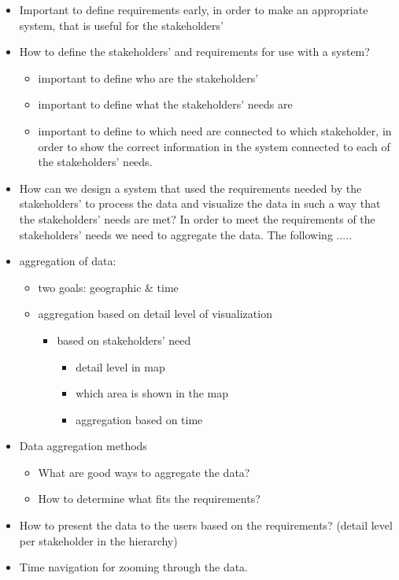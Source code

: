 \begin{itemize}
	\item Important to define requirements early, in order to make an appropriate system, that is useful for the stakeholders'
	\item How to define the stakeholders' and requirements for use with a system?
	\begin{itemize}
		\item important to define who are the stakeholders'
		\item important to define what the stakeholders' needs are
		\item important to define to which need are connected to which stakeholder, in order to show the correct information in the system connected to each of the stakeholders' needs.
	\end{itemize}
	\item How can we design a system that used the requirements needed by the stakeholders' to process the data and visualize the data in such a way that the stakeholders' needs are met?
	In order to meet the requirements of the stakeholders' needs we need to aggregate the data. The following .....
	\item aggregation of data:
	\begin{itemize}
		\item two goals: geographic \& time
		\item aggregation based on detail level of visualization
		\begin{itemize}
			\item based on stakeholders' need
			\begin{itemize}
				\item detail level in map
				\item which area is shown in the map
				\item aggregation based on time
			\end{itemize}
		\end{itemize}
	\end{itemize}
	\item Data aggregation methods
	\begin{itemize}
		\item What are good ways to aggregate the data?
		\item How to determine what fits the requirements?
	\end{itemize}
	\item How to present the data to the users based on the requirements? (detail
	level per stakeholder in the hierarchy)
	\item Time navigation for zooming through the data.
\end{itemize}

